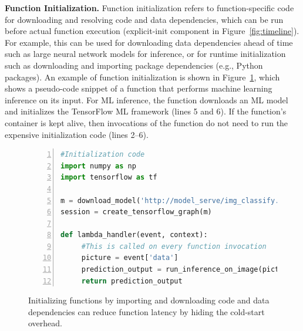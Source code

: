 \noindent \textbf{Function Initialization.}
%
Function initialization refers to function-specific code for downloading and resolving code and data dependencies, which can be run before actual function execution (explicit-init component in Figure~\ref{fig:timeline}). 
For example, this can be used for downloading data dependencies ahead of time such as large neural network models for inference, or for runtime initialization such as downloading and importing package dependencies (e.g., Python packages). 
%
An example of function initialization is shown in Figure~\ref{fig:lambda-example}, which shows a pseudo-code snippet of a function that performs machine learning inference on its input. 
For ML inference, the function downloads an ML model and initializes the TensorFlow ML framework (lines  5 and 6). 
If the function's container is kept alive, then invocations of the function do not need to run the expensive initialization code (lines 2--6). 


\begin{figure}
\begin{lstlisting}[language=Python, numbers=left, frame=single, basicstyle=\footnotesize\sffamily, columns=fullflexible, xleftmargin=10.0ex, xrightmargin=10.0ex]
#Initialization code 
import numpy as np 
import tensorflow as tf
  
m = download_model('http://model_serve/img_classify.pb')
session = create_tensorflow_graph(m) 
  
def lambda_handler(event, context):
     #This is called on every function invocation 
     picture = event['data']
     prediction_output = run_inference_on_image(picture) 
     return prediction_output 
   \end{lstlisting}
   \caption{Initializing functions by importing and downloading code and data dependencies can reduce function latency by hiding the cold-start overhead.}
   \label{fig:lambda-example}
\end{figure}


